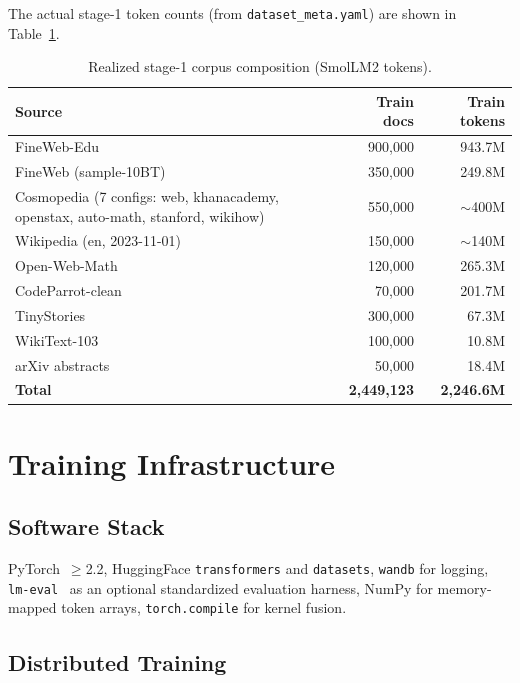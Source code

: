 \documentclass[11pt,a4paper]{article}
\begin{document}
The actual stage-1 token counts (from \texttt{dataset\_meta.yaml}) are
shown in Table~\ref{tab:stage1-data}.

\begin{table}[h]
  \centering
  \caption{Realized stage-1 corpus composition (SmolLM2 tokens).}
  \label{tab:stage1-data}
  \footnotesize
  \begin{tabular}{lrr}
    \toprule
    Source & Train docs & Train tokens \\
    \midrule
    FineWeb-Edu & 900{,}000 & 943.7M \\
    FineWeb (sample-10BT) & 350{,}000 & 249.8M \\
    Cosmopedia (7 configs: web, khanacademy, openstax, auto-math, stanford, wikihow) & 550{,}000 & $\sim$400M \\
    Wikipedia (en, 2023-11-01) & 150{,}000 & $\sim$140M \\
    Open-Web-Math & 120{,}000 & 265.3M \\
    CodeParrot-clean & 70{,}000 & 201.7M \\
    TinyStories & 300{,}000 & 67.3M \\
    WikiText-103 & 100{,}000 & 10.8M \\
    arXiv abstracts & 50{,}000 & 18.4M \\
    \midrule
    \textbf{Total} & \textbf{2{,}449{,}123} & \textbf{2{,}246.6M} \\
    \bottomrule
  \end{tabular}
\end{table}

\section{Training Infrastructure}

\subsection{Software Stack}

PyTorch~$\ge$2.2, HuggingFace \texttt{transformers} and \texttt{datasets},
\texttt{wandb} for logging, \texttt{lm-eval}~\cite{lm-eval-harness} as an
optional standardized evaluation harness, NumPy for memory-mapped token
arrays, \texttt{torch.compile} for kernel fusion.

\subsection{Distributed Training}
\end{document}
